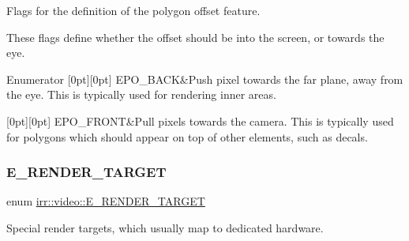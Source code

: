 Flags for the definition of the polygon offset feature. 

These flags define whether the offset should be into the screen, or towards the eye. \begin{DoxyEnumFields}{Enumerator}
[0pt][0pt]{}\mbox{\label{namespaceirr_1_1video_a812b866b910c946f5bc813f8eab31144a73dcec6718742ff2631ab7ca25685b32}} 
E\+P\+O\+\_\+\+B\+A\+CK&Push pixel towards the far plane, away from the eye. This is typically used for rendering inner areas. \\
\hline

[0pt][0pt]{}\mbox{\label{namespaceirr_1_1video_a812b866b910c946f5bc813f8eab31144ae39fa3f07418d3f6f5dd2d245122d2cb}} 
E\+P\+O\+\_\+\+F\+R\+O\+NT&Pull pixels towards the camera. This is typically used for polygons which should appear on top of other elements, such as decals. \\
\hline

\end{DoxyEnumFields}
\mbox{\label{namespaceirr_1_1video_a5b61a3f2bd5d458f76f2eb20b0f40972}} 
\subsubsection{\texorpdfstring{E\+\_\+\+R\+E\+N\+D\+E\+R\+\_\+\+T\+A\+R\+G\+ET}{E\_RENDER\_TARGET}}
{\footnotesize\ttfamily enum \hyperlink{namespaceirr_1_1video_a5b61a3f2bd5d458f76f2eb20b0f40972}{irr\+::video\+::\+E\+\_\+\+R\+E\+N\+D\+E\+R\+\_\+\+T\+A\+R\+G\+ET}}



Special render targets, which usually map to dedicated hardware. 

